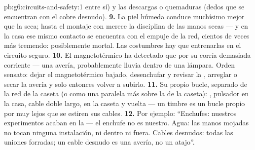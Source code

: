 \begin{solution}{pb:g6:circuits-and-safety:1}
entre sí) y las descargas o quemaduras (dedos que se encuentran con el
cobre desnudo).
\textbf{9.} La piel húmeda conduce muchísimo mejor que la seca; hasta
el montaje con  merece la disciplina de las manos secas --- y
en la casa ese mismo contacto se encuentra con el empuje de la red,
cientos de veces más tremendo: posiblemente mortal. Las costumbres hay
que entrenarlas en el circuito seguro.
\textbf{10.} El magnetotérmico ha detectado que por su 
corría demasiada corriente --- una avería, probablemente lluvia dentro
de una lámpara. Orden sensato: dejar el magnetotérmico bajado,
desenchufar y revisar la , arreglar o secar la avería y solo
entonces volver a subirlo.
\textbf{11.} Su propio bucle, separado de la red de la caseta (o como
una  paralela más sobre la  de la caseta):
, pulsador en la casa, cable doble largo,
 en la caseta y vuelta --- un timbre es un bucle 
propio por muy lejos que se estiren sus cables.
\textbf{12.} Por ejemplo: ``Enchufes: nuestros experimentos acaban en
la  --- el enchufe no es nuestro. Agua: las manos mojadas no
tocan ninguna instalación, ni dentro ni fuera. Cables desnudos: todas
las uniones forradas; un cable desnudo es una avería, no un atajo''.
\end{solution}

